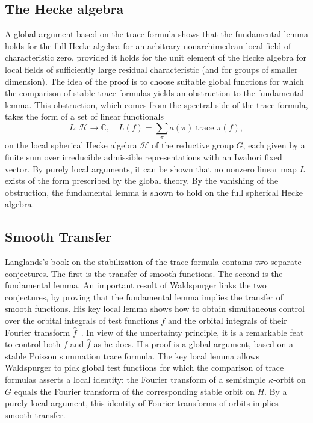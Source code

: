 \documentclass[brochure,english,12pt]{bourbaki}
\def\op#1{{\operatorname{#1}}}
\newcommand{\ring}[1]{\mathbb{#1}}
\begin{document}
\subsection{The Hecke algebra}

 A global argument based on
the trace formula shows that the fundamental lemma holds for the full
Hecke algebra for an arbitrary nonarchimedean local field of
characteristic zero, provided it holds for the unit element of the
Hecke algebra for local fields of sufficiently large residual
characteristic (and for groups of smaller dimension).  
The idea of the proof is to choose suitable global
functions for which the comparison of stable trace formulas yields an
obstruction to the fundamental lemma.  This obstruction, which comes from the
spectral side of the trace formula, takes the form
of a set of linear functionals  
\[
L:{\mathcal H}\to\ring{C},\quad L(f) = \sum_\pi a(\pi) \op{trace}\pi(f),
\]
on the local spherical Hecke
algebra ${\mathcal H}$ of the reductive group $G$, each given by a finite sum over
irreducible admissible representations with an Iwahori fixed vector.
By purely local arguments, it
can be shown that no nonzero linear map $L$ exists of the form
prescribed by the global theory. 
By the vanishing of the obstruction,
the fundamental lemma is shown to hold on the full spherical Hecke algebra.


\subsection{Smooth Transfer}

Langlands's book on the stabilization of the trace formula contains
two separate conjectures.  The first is the transfer of smooth
functions.  The second is the fundamental lemma.  An important result
of Waldspurger links the two conjectures, by proving that the
fundamental lemma implies the transfer of smooth functions.  
His key local lemma shows how to obtain simultaneous control over the
orbital integrals of test functions $f$ and the orbital integrals of
their Fourier transform $\hat f$~\cite[Prop.~8.2]{W}.  
In view of the uncertainty principle, it is a remarkable feat to
control both $f$ and $\hat f$ as he does.
His proof is a global argument, based on a stable Poisson summation trace
formula.  The key local lemma allows Waldspurger to pick global test
functions for which the comparison of trace formulas asserts a
local identity: the Fourier transform of a semisimple
$\kappa$-orbit on $G$ equals the Fourier transform of the corresponding
stable orbit on $H$.  By a purely local argument, this identity of Fourier
transforms of orbits implies smooth transfer.
\end{document}
